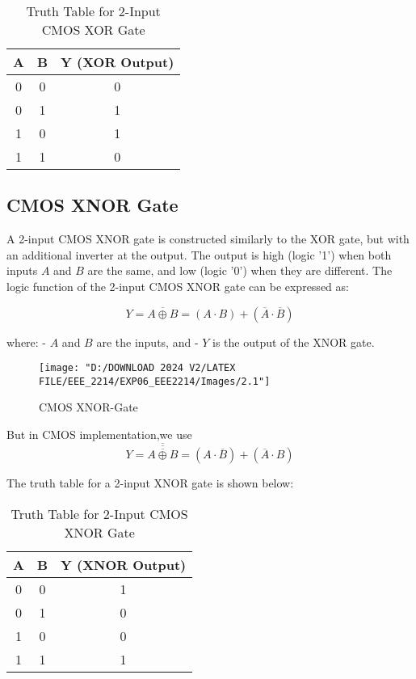 \documentclass[a4paper,12pt]{article}
\begin{document}
	\begin{table}[H]
		\centering
		\caption{Truth Table for 2-Input CMOS XOR Gate}
		\begin{tabular}{|c|c|c|}
			\hline
			\textbf{A} & \textbf{B} & \textbf{Y (XOR Output)} \\ \hline
			0          & 0          & 0                       \\ \hline
			0          & 1          & 1                       \\ \hline
			1          & 0          & 1                       \\ \hline
			1          & 1          & 0                       \\ \hline
		\end{tabular}
		\label{tab:xor_gate}
	\end{table}
	
	\subsection{CMOS XNOR Gate}
	A 2-input CMOS XNOR gate is constructed similarly to the XOR gate, but with an additional inverter at the output. The output is high (logic '1') when both inputs \( A \) and \( B \) are the same, and low (logic '0') when they are different. The logic function of the 2-input CMOS XNOR gate can be expressed as:
	
	\[
	Y = \overline{A \oplus B} = (A \cdot B) + (\overline{A} \cdot \overline{B})
	\]
	
	where:
	- \( A \) and \( B \) are the inputs, and
	- \( Y \) is the output of the XNOR gate.
	
	\begin{figure}[H]
		\centering
		\texttt{[image: "D:/DOWNLOAD 2024 V2/LATEX FILE/EEE\_2214/EXP06\_EEE2214/Images/2.1"]}
		\caption{CMOS XNOR-Gate}
		\label{fig:xnor_gate}
	\end{figure}
	But in CMOS implementation,we use 
		\[
	Y = \overline{\overline{\overline{A \oplus B}}} = (A \cdot \overline{B}) + (\overline{A} \cdot B)
	\]
	
	The truth table for a 2-input XNOR gate is shown below:
	
	\begin{table}[H]
		\centering
		\caption{Truth Table for 2-Input CMOS XNOR Gate}
		\begin{tabular}{|c|c|c|}
			\hline
			\textbf{A} & \textbf{B} & \textbf{Y (XNOR Output)} \\ \hline
			0          & 0          & 1                        \\ \hline
			0          & 1          & 0                        \\ \hline
			1          & 0          & 0                        \\ \hline
			1          & 1          & 1                        \\ \hline
		\end{tabular}
		\label{tab:xnor_gate}
	\end{table}
	
\end{document}
